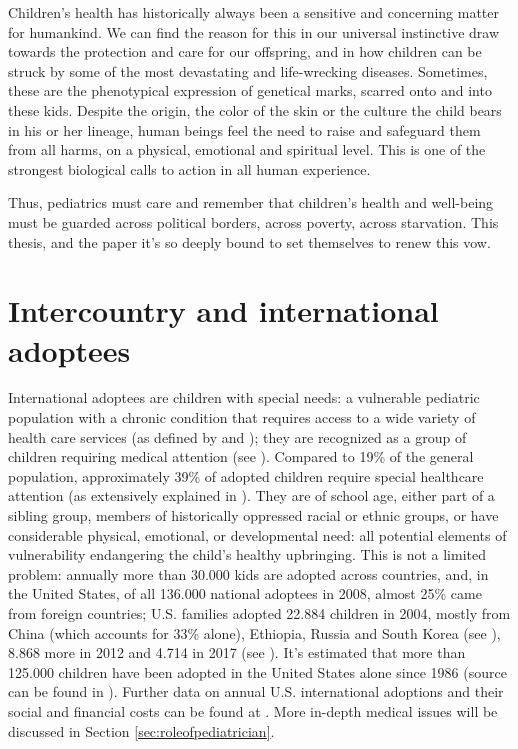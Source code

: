 

\label{chap:introduction}
Children's health has historically always been a sensitive and concerning matter for humankind. We can find the reason for this in our universal instinctive draw towards the protection and care for our offspring, and in how children can be struck by some of the most devastating and life-wrecking diseases. Sometimes, these are the phenotypical expression of genetical marks, scarred onto and into these kids. Despite the origin, the color of the skin or the culture the child bears in his or her lineage, human beings feel the need to raise and safeguard them from all harms, on a physical, emotional and spiritual level. This is one of the strongest biological calls to action in all human experience.

Thus, pediatrics must care and remember that children's health and well-being must be guarded across political borders, across poverty, across starvation. This thesis, and the paper it's so deeply bound to set themselves to renew this vow.

\section{Intercountry and international adoptees}\label{sec:internationaladoptees}
International adoptees are children with special needs: a vulnerable pediatric population with a chronic condition that requires access to a wide variety of health care services (as defined by \cite{notonlyinfectious} and \cite{nonsoloinfezioni}); they are recognized as a group of children requiring medical attention (see \cite{caringfor}). Compared to 19\% of the general population, approximately 39\% of adopted children require special healthcare attention (as extensively explained in \cite{nelson}). They are of school age, either part of a sibling group, members of historically oppressed racial or ethnic groups, or have considerable physical, emotional, or developmental need: all potential elements of vulnerability endangering the child's healthy upbringing. This is not a limited problem: annually more than 30.000 kids are adopted across countries, and, in the United States, of all 136.000 national adoptees in 2008, almost 25\% came from foreign countries; U.S. families adopted 22.884 children in 2004, mostly from China (which accounts for 33\% alone), Ethiopia, Russia and South Korea (see \cite{nelson}), 8.868 more in 2012 and 4.714 in 2017 (see \cite{usreport}). It's estimated that more than 125.000 children have been adopted in the United States alone since 1986 (source can be found in \cite{caringfor}). Further data on annual U.S. international adoptions and their social and financial costs can be found at \cite{usreportsite}. More in-depth medical issues will be discussed in Section \ref{sec:roleofpediatrician}.

